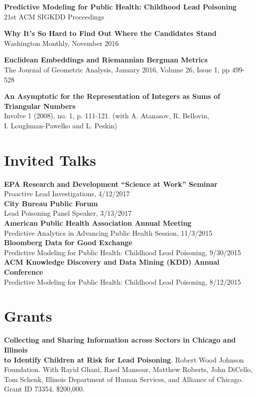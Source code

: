 \documentclass[margin,line]{resume}
\begin{document}
\begin{resume}
	{\bf Predictive Modeling for Public Health: Childhood Lead Poisoning} \\
        21st ACM SIGKDD Proceedings

        {\bf Why It’s So Hard to Find Out Where the Candidates Stand} \\
        Washington Monthly, November 2016

	{\bf Euclidean Embeddings and Riemannian Bergman Metrics} \\
	The Journal of Geometric Analysis, January 2016, Volume 26, Issue 1, pp 499-528

	{\bf An Asymptotic for the Representation of Integers as Sums of\\Triangular Numbers} \\
	Involve 1 (2008), no. 1, p. 111-121. (with A. Atanasov, R. Bellovin,\\ I. Loughman-Pawelko and L. Peskin)

	\section{\mysidestyle Invited Talks}
	{\bf EPA Research and Development ``Science at Work'' Seminar} \\
        Proactive Lead Investigations, 4/12/2017 \\
	{\bf City Bureau Public Forum} \\
        Lead Poisoning Panel Speaker, 3/13/2017 \\
	{\bf American Public Health Association Annual Meeting} \\
    Predictive Analytics in Advancing Public Health Session, 11/3/2015 \\
	{\bf Bloomberg Data for Good Exchange} \\
    Predictive Modeling for Public Health: Childhood Lead Poisoning, 9/30/2015 \\
    {\bf ACM Knowledge Discovery and Data Mining (KDD) Annual Conference} \\
        Predictive Modeling for Public Health: Childhood Lead Poisoning, 8/12/2015\\

	\section{\mysidestyle Grants}
        {\bf Collecting and Sharing Information across Sectors in Chicago and Illinois\\ to Identify Children at Risk for Lead Poisoning}. Robert Wood Johnson\\ Foundation. With Rayid Ghani, Raed Mansour, Matthew Roberts, John DiCello,\\ Tom Schenk,  Illinois Department of Human Services, and Alliance of Chicago.\\ Grant ID 73354. \$200,000. \\


\end{resume}
\end{document}
